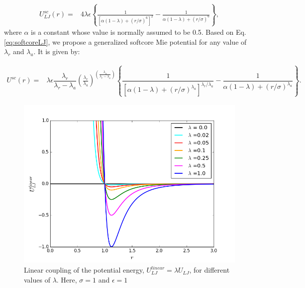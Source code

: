 \begin{equation}
\label{eq:softcoreLJ}
\begin{aligned}
U_{LJ}^{sc}(r) {}=& 4\lambda\epsilon \left\lbrace\frac{1}{\left[\alpha(1-\lambda)+ (r/\sigma)^{6}\right]^{2}} - \frac{1}{\alpha(1-\lambda)+(r/\sigma)^{6}}\right\rbrace ,
\end{aligned}
\end{equation}
where $\alpha$ is a constant whose value is  normally assumed to be 0.5.    Based on Eq. \ref{eq:softcoreLJ}, we propose a generalized softcore Mie potential for any value of $\lambda _{r}$ and $\lambda _{a}$. It is given by:

\begin{equation}
\label{eq:softcore}
\begin{aligned}
U^{sc}(r) {}=& \lambda\epsilon\dfrac{\lambda_r}{\lambda_r - \lambda_a} \left(\frac{\lambda_r}{\lambda_a} \right)^{\left( \frac{\lambda_a}{\lambda_r - \lambda_a} \right)} \left\lbrace\dfrac{1}{\left[\alpha(1-\lambda)+ (r/\sigma)^{\lambda_a}\right]^{\lambda_{r}/\lambda_{a}}} - \dfrac{1}{\alpha(1-\lambda)+(r/\sigma)^{\lambda_a}}\right\rbrace .
\end{aligned}
\end{equation}

\begin{figure}[H]
	\centering
	\includegraphics[width=0.8\linewidth]{Figures/linear}
	\caption{Linear coupling of the potential energy, $U^{linear}_{LJ} = \lambda U_{LJ}$, for different values of $\lambda$. Here, $\sigma=1$ and $\epsilon=1$}
	\label{fig:linearpoten}
\end{figure}    

